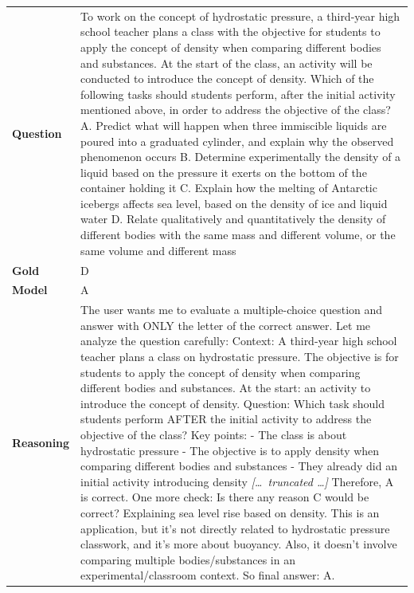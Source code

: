 \begin{longtable}{@{}l p{13cm}@{}}
  \textbf{Question}  & To work on the concept of hydrostatic pressure, a third-year high school teacher plans a class with the objective for students to apply the concept of density when comparing different bodies and substances. At the start of the class, an activity will be conducted to introduce the concept of density. Which of the following tasks should students perform, after the initial activity mentioned above, in order to address the objective of the class? \newline A. Predict what will happen when three immiscible liquids are poured into a graduated cylinder, and explain why the observed phenomenon occurs \newline B. Determine experimentally the density of a liquid based on the pressure it exerts on the bottom of the container holding it \newline C. Explain how the melting of Antarctic icebergs affects sea level, based on the density of ice and liquid water \newline D. Relate qualitatively and quantitatively the density of different bodies with the same mass and different volume, or the same volume and different mass   \\
  \textbf{Gold}      & D       \\
  \textbf{Model}     & A  \\
  \textbf{Reasoning} & The user wants me to evaluate a multiple-choice question and answer with ONLY the letter of the correct answer. \newline Let me analyze the question carefully: \newline Context: A third-year high school teacher plans a class on hydrostatic pressure. The objective is for students to apply the concept of density when comparing different bodies and substances. \newline At the start: an activity to introduce the concept of density. \newline Question: Which task should students perform AFTER the initial activity to address the objective of the class? \newline Key points: \newline - The class is about hydrostatic pressure \newline - The objective is to apply density when comparing different bodies and substances \newline - They already did an initial activity introducing density \newline \textit{[\ldots\ truncated \ldots]} \newline Therefore, A is correct. \newline One more check: Is there any reason C would be correct? Explaining sea level rise based on density. This is an application, but it's not directly related to hydrostatic pressure classwork, and it's more about buoyancy. Also, it doesn't involve comparing multiple bodies/substances in an experimental/classroom context. \newline So final answer: A.  \\

\end{longtable}
